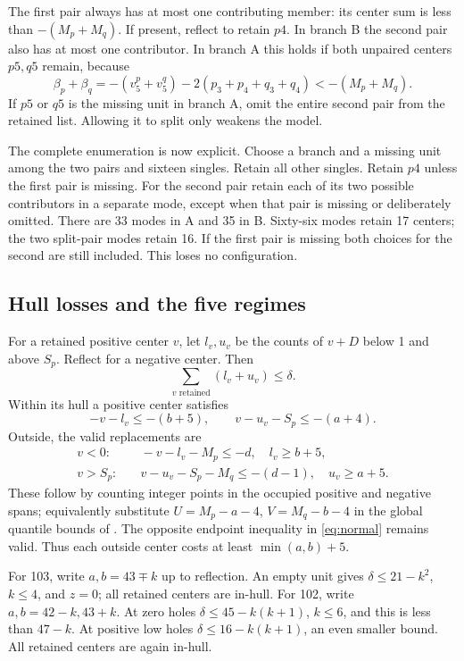 \documentclass[11pt,a4paper]{article}
\begin{document}
The first pair always has at most one contributing member: its center
sum is less than $-(M_p+M_q)$. If present, reflect to retain $p4$.
In branch B the second pair also has at most one contributor. In branch A
this holds if both unpaired centers $p5,q5$ remain, because
\[
 \beta_p+\beta_q=-(v^p_5+v^q_5)-2(p_3+p_4+q_3+q_4)
 <-(M_p+M_q).
\]
If $p5$ or $q5$ is the missing unit in branch A, omit the entire second
pair from the retained list. Allowing it to split only weakens the model.

The complete enumeration is now explicit. Choose a branch and a missing
unit among the two pairs and sixteen singles. Retain all other singles.
Retain $p4$ unless the first pair is missing. For the second pair retain
each of its two possible contributors in a separate mode, except when
that pair is missing or deliberately omitted. There are 33 modes in A
and 35 in B. Sixty-six modes retain 17 centers; the two split-pair modes
retain 16. If the first pair is missing both choices for the second are
still included. This loses no configuration.

\subsection{Hull losses and the five regimes}
For a retained positive center $v$, let $l_v,u_v$ be the counts of $v+D$
below 1 and above $S_p$. Reflect for a negative center. Then
\begin{equation}\label{eq:loss}
 \sum_{v\text{ retained}}(l_v+u_v)\le\delta.
\end{equation}
Within its hull a positive center satisfies
\begin{equation}\label{eq:normal}
 -v-l_v\le-(b+5),\qquad v-u_v-S_p\le-(a+4).
\end{equation}
Outside, the valid replacements are
\begin{align}
 v<0:&\quad -v-l_v-M_p\le-d,\quad l_v\ge b+5,\label{eq:outside-low}\\
 v>S_p:&\quad v-u_v-S_p-M_q\le-(d-1),\quad u_v\ge a+5.\label{eq:outside-high}
\end{align}
These follow by counting integer points in the occupied positive and
negative spans; equivalently substitute
$U=M_p-a-4$, $V=M_q-b-4$ in the global quantile bounds of
\cite{previous}. The opposite endpoint inequality in \eqref{eq:normal}
remains valid. Thus each outside center costs at least $\min(a,b)+5$.

For 103, write $a,b=43\mp k$ up to reflection. An empty unit gives
$\delta\le21-k^2$, $k\le4$, and $z=0$; all retained centers are in-hull.
For 102, write $a,b=42-k,43+k$. At zero holes
$\delta\le45-k(k+1)$, $k\le6$, and this is less than $47-k$.
At positive low holes $\delta\le16-k(k+1)$, an even smaller bound.
All retained centers are again in-hull.
\end{document}
